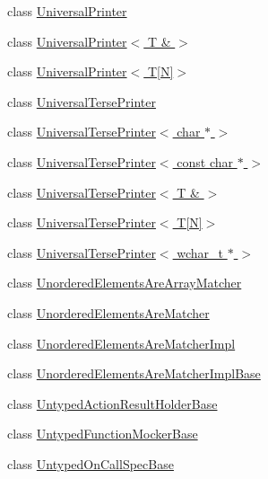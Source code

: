 \begin{DoxyCompactItemize}
\item 
class \hyperlink{classtesting_1_1internal_1_1UniversalPrinter}{Universal\+Printer}
\item 
class \hyperlink{classtesting_1_1internal_1_1UniversalPrinter_3_01T_01_6_01_4}{Universal\+Printer$<$ T \& $>$}
\item 
class \hyperlink{classtesting_1_1internal_1_1UniversalPrinter_3_01T[N]_4}{Universal\+Printer$<$ T\mbox{[}\+N\mbox{]}$>$}
\item 
class \hyperlink{classtesting_1_1internal_1_1UniversalTersePrinter}{Universal\+Terse\+Printer}
\item 
class \hyperlink{classtesting_1_1internal_1_1UniversalTersePrinter_3_01char_01_5_01_4}{Universal\+Terse\+Printer$<$ char $\ast$ $>$}
\item 
class \hyperlink{classtesting_1_1internal_1_1UniversalTersePrinter_3_01const_01char_01_5_01_4}{Universal\+Terse\+Printer$<$ const char $\ast$ $>$}
\item 
class \hyperlink{classtesting_1_1internal_1_1UniversalTersePrinter_3_01T_01_6_01_4}{Universal\+Terse\+Printer$<$ T \& $>$}
\item 
class \hyperlink{classtesting_1_1internal_1_1UniversalTersePrinter_3_01T[N]_4}{Universal\+Terse\+Printer$<$ T\mbox{[}\+N\mbox{]}$>$}
\item 
class \hyperlink{classtesting_1_1internal_1_1UniversalTersePrinter_3_01wchar__t_01_5_01_4}{Universal\+Terse\+Printer$<$ wchar\+\_\+t $\ast$ $>$}
\item 
class \hyperlink{classtesting_1_1internal_1_1UnorderedElementsAreArrayMatcher}{Unordered\+Elements\+Are\+Array\+Matcher}
\item 
class \hyperlink{classtesting_1_1internal_1_1UnorderedElementsAreMatcher}{Unordered\+Elements\+Are\+Matcher}
\item 
class \hyperlink{classtesting_1_1internal_1_1UnorderedElementsAreMatcherImpl}{Unordered\+Elements\+Are\+Matcher\+Impl}
\item 
class \hyperlink{classtesting_1_1internal_1_1UnorderedElementsAreMatcherImplBase}{Unordered\+Elements\+Are\+Matcher\+Impl\+Base}
\item 
class \hyperlink{classtesting_1_1internal_1_1UntypedActionResultHolderBase}{Untyped\+Action\+Result\+Holder\+Base}
\item 
class \hyperlink{classtesting_1_1internal_1_1UntypedFunctionMockerBase}{Untyped\+Function\+Mocker\+Base}
\item 
class \hyperlink{classtesting_1_1internal_1_1UntypedOnCallSpecBase}{Untyped\+On\+Call\+Spec\+Base}

\end{DoxyCompactItemize}
